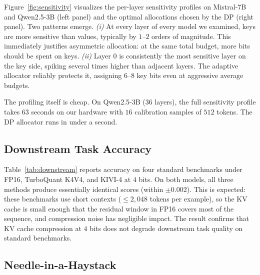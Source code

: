 \documentclass[11pt]{article}
\begin{document}
Figure~\ref{fig:sensitivity} visualizes the per-layer sensitivity profiles on Mistral-7B and Qwen2.5-3B (left panel) and the optimal allocations chosen by the DP (right panel). Two patterns emerge. \emph{(i)} At every layer of every model we examined, keys are more sensitive than values, typically by $1$--$2$ orders of magnitude. This immediately justifies asymmetric allocation: at the same total budget, more bits should be spent on keys. \emph{(ii)} Layer $0$ is consistently the most sensitive layer on the key side, spiking several times higher than adjacent layers. The adaptive allocator reliably protects it, assigning $6$--$8$ key bits even at aggressive average budgets.

The profiling itself is cheap. On Qwen2.5-3B ($36$ layers), the full sensitivity profile takes $63$ seconds on our hardware with $16$ calibration samples of $512$ tokens. The DP allocator runs in under a second.

\subsection{Downstream Task Accuracy}
\label{sec:downstream}

\begin{table}[t]
\centering
\caption{Downstream task accuracy under 4-bit KV cache compression on Qwen2.5-32B and Mistral-7B. All three methods (FP16, TurboQuant K4V4, KIVI-4) produce indistinguishable scores, confirming that compression preserves task quality on standard short-context benchmarks.}
\label{tab:downstream}
\small

\end{table}

Table~\ref{tab:downstream} reports accuracy on four standard benchmarks under FP16, TurboQuant K4V4, and KIVI-4 at $4$ bits. On both models, all three methods produce essentially identical scores (within $\pm 0.002$). This is expected: these benchmarks use short contexts ($\le 2{,}048$ tokens per example), so the KV cache is small enough that the residual window in FP16 covers most of the sequence, and compression noise has negligible impact. The result confirms that KV cache compression at $4$ bits does not degrade downstream task quality on standard benchmarks.

\subsection{Needle-in-a-Haystack}
\label{sec:needle}
\end{document}
